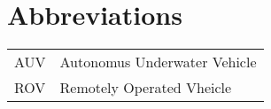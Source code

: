 \chapter{Abbreviations}
\begin{center}
\begin{tabular}{|l|l|}
\hline
AUV & Autonomus Underwater Vehicle \\
ROV & Remotely Operated Vheicle \\
\hline
\end{tabular}
\end{center}